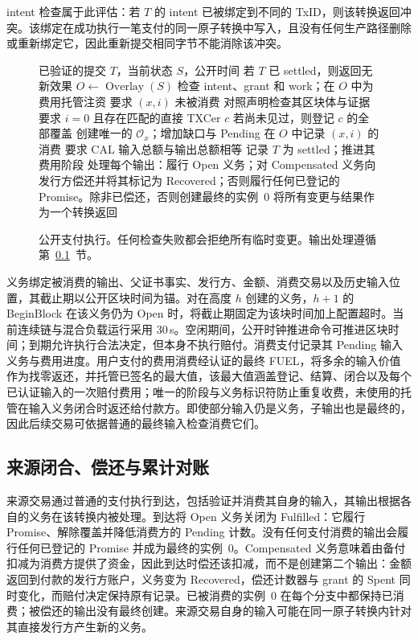intent 检查属于此评估：若 $T$ 的 intent 已被绑定到不同的 TxID，则该转换返回冲突。该绑定在成功执行一笔支付的同一原子转换中写入，且没有任何生产路径删除或重新绑定它，因此重新提交相同字节不能消除该冲突。

\begin{figure}[t]
  \small
  \begin{algorithmic}[1]
    \REQUIRE 已验证的提交 $T$，当前状态 $S$，公开时间
    \STATE 若 $T$ 已 settled，则返回无新效果
    \STATE $O\gets\operatorname{Overlay}(S)$
    \STATE 检查 intent、grant 和 work；在 $O$ 中为费用托管注资
      \STATE 要求 $(x,i)$ 未被消费
        \STATE 对照声明检查其区块体与证据
      \ELSE
        \STATE 要求 $i=0$ 且存在匹配的直接 TXCer $c$
        \STATE 若尚未见过，则登记 $c$ 的全部覆盖
        \STATE 创建唯一的 $\mathcal{O}_x$；增加缺口与 Pending
      \ENDIF
      \STATE 在 $O$ 中记录 $(x,i)$ 的消费
    \ENDFOR
    \STATE 要求 CAL 输入总额与输出总额相等
    \STATE 记录 $T$ 为 settled；推进其费用阶段
    \STATE 处理每个输出：履行 Open 义务；对 Compensated 义务向发行方偿还并将其标记为 Recovered；否则履行任何已登记的 Promise。除非已偿还，否则创建最终的实例~0
    \STATE 将所有变更与结果作为一个转换返回
  \end{algorithmic}
  \caption{公开支付执行。任何检查失败都会拒绝所有临时变更。输出处理遵循第~\ref{sec:protocol-closure}~节。}
  \label{fig:protocol-payment}
\end{figure}

义务绑定被消费的输出、父证书事实、发行方、金额、消费交易以及历史输入位置，其截止期以公开区块时间为锚。对在高度 $h$ 创建的义务，$h+1$ 的 BeginBlock 在该义务仍为 Open 时，将截止期固定为该块时间加上配置超时。当前连续链与混合负载运行采用 30\,s。空闲期间，公开时钟推进命令可推进区块时间；到期允许执行合法决定，但本身不执行赔付。消费支付记录其 Pending 输入义务与费用进度。用户支付的费用消费经认证的最终 FUEL，将多余的输入价值作为找零返还，并托管已签名的最大值，该最大值涵盖登记、结算、闭合以及每个已认证输入的一次赔付费用；唯一的阶段与义务标识符防止重复收费，未使用的托管在输入义务闭合时返还给付款方。即使部分输入仍是义务，子输出也是最终的，因此后续交易可依据普通的最终输入检查消费它们。

\subsection{来源闭合、偿还与累计对账}
\label{sec:protocol-closure}

来源交易通过普通的支付执行到达，包括验证并消费其自身的输入，其输出根据各自的义务在该转换内被处理。到达将 Open 义务关闭为 Fulfilled：它履行 Promise、解除覆盖并降低消费方的 Pending 计数。没有任何支付消费的输出会履行任何已登记的 Promise 并成为最终的实例~0。Compensated 义务意味着由备付扣减为消费方提供了资金，因此到达时偿还该扣减，而不是创建第二个输出：金额返回到付款的发行方账户，义务变为 Recovered，偿还计数器与 grant 的 Spent 同时变化，而赔付决定保持原有记录。已被消费的实例~0 在每个分支中都保持已消费；被偿还的输出没有最终创建。来源交易自身的输入可能在同一原子转换内针对其直接发行方产生新的义务。

